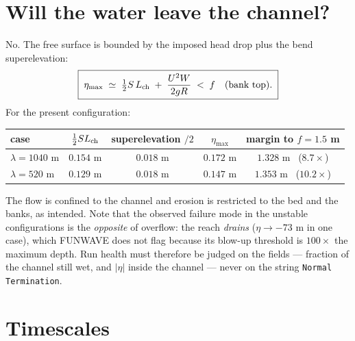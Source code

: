 \documentclass[11pt,a4paper]{article}
\newcommand{\code}[1]{\texttt{\small #1}}
\begin{document}
\section{Will the water leave the channel?}
\label{sec:freeboard}

No. The free surface is bounded by the imposed head drop plus the bend superelevation:
\begin{equation}
  \boxed{\;\eta_{\max}\;\simeq\;\tfrac12 S\,L_{\rm ch} \;+\; \frac{U^2W}{2gR}
  \;<\; f \quad\text{(bank top)}.\;}
  \label{eq:freeboard}
\end{equation}
For the present configuration:
\begin{center}
\begin{tabular}{lcccc}
\toprule
case & $\tfrac12 S L_{\rm ch}$ & superelevation $/2$ & $\eta_{\max}$ & margin to $f=1.5$ m \\
\midrule
$\lambda=1040$ m & $0.154$ m & $0.018$ m & $0.172$ m & $1.328$ m \ ($8.7\times$) \\
$\lambda=520$ m  & $0.129$ m & $0.018$ m & $0.147$ m & $1.353$ m \ ($10.2\times$) \\
\bottomrule
\end{tabular}
\end{center}
The flow is confined to the channel and erosion is restricted to the bed and the banks, as
intended. Note that the observed failure mode in the unstable configurations is the
\emph{opposite} of overflow: the reach \emph{drains} ($\eta\to-73$ m in one case), which
FUNWAVE does not flag because its blow-up threshold is $100\times$ the maximum depth. Run
health must therefore be judged on the fields --- fraction of the channel still wet, and
$|\eta|$ inside the channel --- never on the string \code{Normal Termination}.

\section{Timescales}
\label{sec:timescales}
\end{document}

